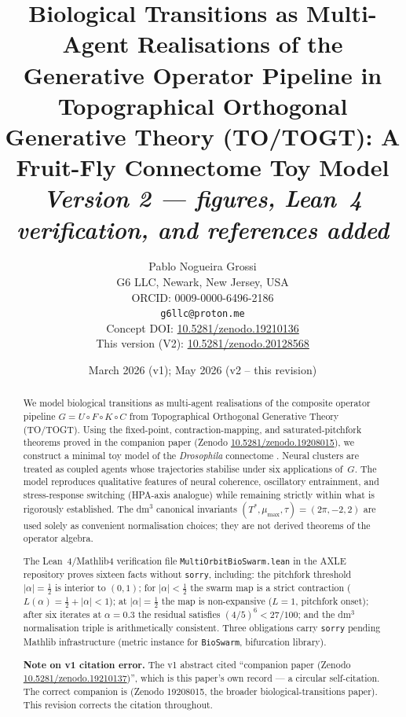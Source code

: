 \documentclass[12pt,a4paper]{article}
\title{%
  \textbf{Biological Transitions as Multi-Agent Realisations of the}\\
  \textbf{Generative Operator Pipeline in Topographical Orthogonal}\\
  \textbf{Generative Theory (TO/TOGT): A Fruit-Fly Connectome Toy Model}\\[0.5em]
  \large\emph{Version 2 --- figures, Lean~4 verification, and references added}%
}
\author{%
  Pablo Nogueira Grossi\\
  G6 LLC, Newark, New Jersey, USA\\
  ORCID: 0009-0000-6496-2186\\
  \texttt{g6llc@proton.me}\\[0.3em]
  \small Concept DOI: \href{https://doi.org/10.5281/zenodo.19210136}{10.5281/zenodo.19210136}\\
  \small This version (V2): \href{https://doi.org/10.5281/zenodo.20128568}{10.5281/zenodo.20128568}
}
\date{March 2026 (v1); May 2026 (v2 -- this revision)}
\begin{document}
\maketitle

\begin{abstract}
We model biological transitions as multi-agent realisations of the
composite operator pipeline $G = U \circ F \circ K \circ C$ from
Topographical Orthogonal Generative Theory (TO/TOGT). Using the
fixed-point, contraction-mapping, and saturated-pitchfork theorems
proved in the companion paper \cite{Grossi2026_MultiAgent} (Zenodo
\href{https://doi.org/10.5281/zenodo.19208015}{10.5281/zenodo.19208015}),
we construct a minimal toy model of the \textit{Drosophila} connectome
\cite{Dorkenwald2024}. Neural clusters are treated as coupled agents
whose trajectories stabilise under six applications of~$G$. The model
reproduces qualitative features of neural coherence, oscillatory
entrainment, and stress-response switching (HPA-axis analogue) while
remaining strictly within what is rigorously established. The dm$^3$
canonical invariants $(T^{*}, \mu_{\max}, \tau) = (2\pi, -2, 2)$ are
used solely as convenient normalisation choices; they are not derived
theorems of the operator algebra.

The Lean~4/Mathlib4 verification file \texttt{MultiOrbitBioSwarm.lean}
in the AXLE repository \cite{AXLE2026} proves sixteen facts without
\texttt{sorry}, including: the pitchfork threshold $|\alpha|=\tfrac{1}{2}$
is interior to $(0,1)$; for $|\alpha|<\tfrac{1}{2}$ the swarm map is
a strict contraction ($L(\alpha)=\tfrac{1}{2}+|\alpha|<1$); at
$|\alpha|=\tfrac{1}{2}$ the map is non-expansive ($L=1$, pitchfork
onset); after six iterates at $\alpha=0.3$ the residual satisfies
$(4/5)^{6}<27/100$; and the dm$^3$ normalisation triple is
arithmetically consistent.  Three obligations carry \texttt{sorry}
pending Mathlib infrastructure (metric instance for \texttt{BioSwarm},
bifurcation library).

\smallskip\noindent\textbf{Note on v1 citation error.}
The v1 abstract cited ``companion paper (Zenodo
\href{https://doi.org/10.5281/zenodo.19210137}{10.5281/zenodo.19210137})'',
which is this paper's own record --- a circular self-citation. The
correct companion is \cite{Grossi2026_MultiAgent} (Zenodo 19208015,
the broader biological-transitions paper). This revision corrects the
citation throughout.
\end{abstract}
\end{document}
